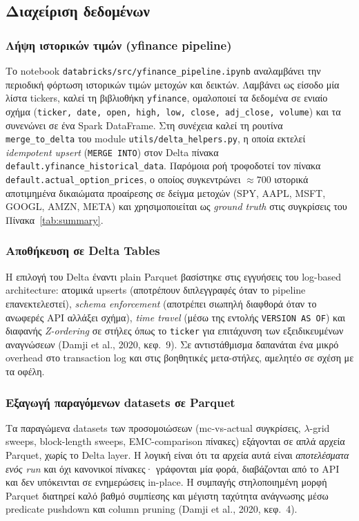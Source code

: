 \documentclass[12pt]{article}
\begin{document}
\subsection{Διαχείριση δεδομένων}

\subsubsection{Λήψη ιστορικών τιμών (yfinance pipeline)}
Το notebook \texttt{databricks/src/yfinance\_pipeline.ipynb} αναλαμβάνει την περιοδική φόρτωση ιστορικών τιμών μετοχών και δεικτών. Λαμβάνει ως είσοδο μία λίστα tickers, καλεί τη βιβλιοθήκη \texttt{yfinance}, ομαλοποιεί τα δεδομένα σε ενιαίο σχήμα (\texttt{ticker, date, open, high, low, close, adj\_close, volume}) και τα συνενώνει σε ένα Spark DataFrame. Στη συνέχεια καλεί τη ρουτίνα \texttt{merge\_to\_delta} του module \texttt{utils/delta\_helpers.py}, η οποία εκτελεί \emph{idempotent upsert} (\texttt{MERGE INTO}) στον Delta πίνακα \texttt{default.yfinance\_historical\_data}. Παρόμοια ροή τροφοδοτεί τον πίνακα \texttt{default.actual\_option\_prices}, ο οποίος συγκεντρώνει $\approx 700$ ιστορικά αποτιμημένα δικαιώματα προαίρεσης σε δείγμα μετοχών (SPY, AAPL, MSFT, GOOGL, AMZN, META) και χρησιμοποιείται ως \emph{ground truth} στις συγκρίσεις του Πίνακα~\ref{tab:summary}.

\subsubsection{Αποθήκευση σε Delta Tables}
Η επιλογή του Delta έναντι plain Parquet βασίστηκε στις εγγυήσεις του log-based architecture: ατομικά upserts (αποτρέπουν διπλεγγραφές όταν το pipeline επανεκτελεστεί), \emph{schema enforcement} (αποτρέπει σιωπηλή διαφθορά όταν το ανωφερές API αλλάξει σχήμα), \emph{time travel} (μέσω της εντολής \texttt{VERSION AS OF}) και διαφανής \emph{Z-ordering} σε στήλες όπως το \texttt{ticker} για επιτάχυνση των εξειδικευμένων αναγνώσεων (Damji et al., 2020, κεφ.~9). Σε αντιστάθμισμα δαπανάται ένα μικρό overhead στο transaction log και στις βοηθητικές μετα-στήλες, αμελητέο σε σχέση με τα οφέλη.

\subsubsection{Εξαγωγή παραγόμενων datasets σε Parquet}
Τα παραγώμενα datasets των προσομοιώσεων (mc-vs-actual συγκρίσεις, $\lambda$-grid sweeps, block-length sweeps, EMC-comparison πίνακες) εξάγονται σε απλά αρχεία Parquet, χωρίς το Delta layer. Η λογική είναι ότι τα αρχεία αυτά είναι \emph{αποτελέσματα ενός run} και όχι κανονικοί πίνακες· γράφονται μία φορά, διαβάζονται από το API και δεν υπόκεινται σε ενημερώσεις in-place. Η συμπαγής στηλοποιημένη μορφή Parquet διατηρεί καλό βαθμό συμπίεσης και μέγιστη ταχύτητα ανάγνωσης μέσω predicate pushdown και column pruning (Damji et al., 2020, κεφ.~4).
\end{document}
